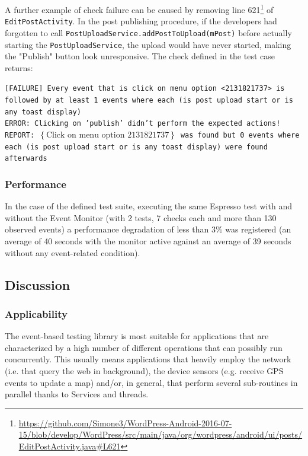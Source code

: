 \documentclass[11pt,a4paper,notitlepage]{article}
\begin{document}
A further example of check failure can be caused by removing line 621\footnote{\url{https://github.com/Simone3/WordPress-Android-2016-07-15/blob/develop/WordPress/src/main/java/org/wordpress/android/ui/posts/EditPostActivity.java\#L621}} of \texttt{EditPostActivity}. In the post publishing procedure, if the developers had forgotten to call \texttt{PostUploadService.addPostToUpload(mPost)} before actually starting the \texttt{PostUploadService}, the upload would have never started, making the "Publish" button look unresponsive. The check defined in the test case returns:

\texttt{[FAILURE] Every event that is click on menu option <2131821737> is followed by at least 1 events where each (is post upload start or is any toast display)\\
	ERROR: Clicking on 'publish' didn't perform the expected actions!\\
	REPORT: $\left\{\text{Click on menu option 2131821737}\right\}$ was found but 0 events where each (is post upload start or is any toast display) were found afterwards}

\subsubsection{Performance}
In the case of the defined test suite, executing the same Espresso test with and without the Event Monitor (with 2 tests, 7 checks each and more than 130 observed events) a performance degradation of less than 3\% was registered (an average of 40 seconds with the monitor active against an average of 39 seconds without any event-related condition).

\subsection{Discussion}

\subsubsection{Applicability}
The event-based testing library is most suitable for applications that are characterized by a high number of different operations that can possibly run concurrently. This usually means applications that heavily employ the network (i.e. that query the web in background), the device sensors (e.g. receive GPS events to update a map) and/or, in general, that perform several sub-routines in parallel thanks to Services and threads.
\end{document}
